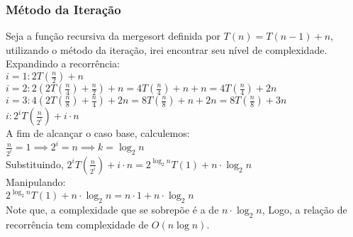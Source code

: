 \subsubsection{Método da Iteração}
Seja a função recursiva da mergesort definida por $T(n) = T(n-1) + n$, utilizando o método da iteração, irei encontrar seu nível de complexidade. \\
Expandindo a recorrência:\\
$i = 1 : 2T(\frac{n}{2}) + n$ \\
$i = 2 : 2(2T(\frac{n}{4}) + \frac{n}{2}) + n = 4T(\frac{n}{4}) + n + n = 4T(\frac{n}{4}) + 2n$ \\
$i = 3 : 4(2T(\frac{n}{8}) + \frac{n}{4}) + 2n = 8T(\frac{n}{8}) + n + 2n = 8T(\frac{n}{8}) + 3n$ \\
$i : 2^iT(\frac{n}{2^i}) + i\cdot n$ \\
A fim de alcançar o caso base, calculemos: \\
$\frac{n}{2^i} = 1 \implies 2^i = n \implies k = \log_{2}{n}$ \\
Substituindo, $2^iT(\frac{n}{2^i}) + i\cdot n = 2^{\log_{2}{n}}T(1) + n \cdot \log_{2}{n}$ \\
Manipulando: \\
$2^{\log_{2}{n}}T(1) + n \cdot \log_{2}{n} = n \cdot 1 + n \cdot \log_{2}{n}$ \\
Note que, a complexidade que se sobrepõe é a de $n\cdot \log_{2}{n}$, Logo, a relação de recorrência tem complexidade de $O(n\log{n})$.